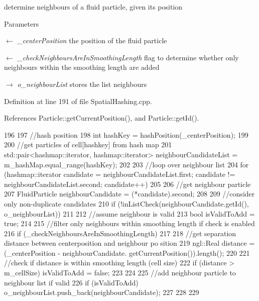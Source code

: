 determine neighbours of a fluid particle, given its position 


\begin{DoxyParams}{Parameters}
\item[\mbox{$\leftarrow$} {\em \_\-centerPosition}]the position of the fluid particle \item[\mbox{$\leftarrow$} {\em \_\-checkNeighboursAreInSmoothingLength}]flag to determine whether only neighbours within the smoothing length are added \item[\mbox{$\rightarrow$} {\em o\_\-neighbourList}]stores the list neighbours \end{DoxyParams}


Definition at line 191 of file SpatialHashing.cpp.



References Particle::getCurrentPosition(), and Particle::getId().




\begin{DoxyCode}
196 {
197     //hash position
198     int hashKey = hashPosition(_centerPosition);
199 
200     //get particles of cell[hashkey] from hash map
201     std::pair<hashmap::iterator, hashmap::iterator> neighbourCandidateList = 
      m_hashMap.equal_range(hashKey);
202 
203     //loop over neighbour list
204     for (hashmap::iterator candidate = neighbourCandidateList.first; candidate !=
       neighbourCandidateList.second; candidate++)
205     {
206         //get neighbour particle
207         FluidParticle neighbourCandidate = (*candidate).second;
208 
209         //consider only non-duplicate candidates
210         if (!inListCheck(neighbourCandidate.getId(), o_neighbourList))
211         {
212             //assume neighbour is valid
213             bool isValidToAdd = true;
214 
215             //filter only neighbours within smoothing length if check is enabled
216             if (_checkNeighboursAreInSmoothingLength)
217             {
218                 //get separation distance between centerposition and neighbour po
      sition
219                 ngl::Real distance = (_centerPosition - neighbourCandidate.
      getCurrentPosition()).length();
220 
221                 //check if distance is within smoothing length (cell size)
222                 if (distance > m_cellSize) isValidToAdd = false;
223             }
224 
225             //add neighbour particle to neighbour list if valid
226             if (isValidToAdd) o_neighbourList.push_back(neighbourCandidate);
227         }
228     }
229 }
\end{DoxyCode}




